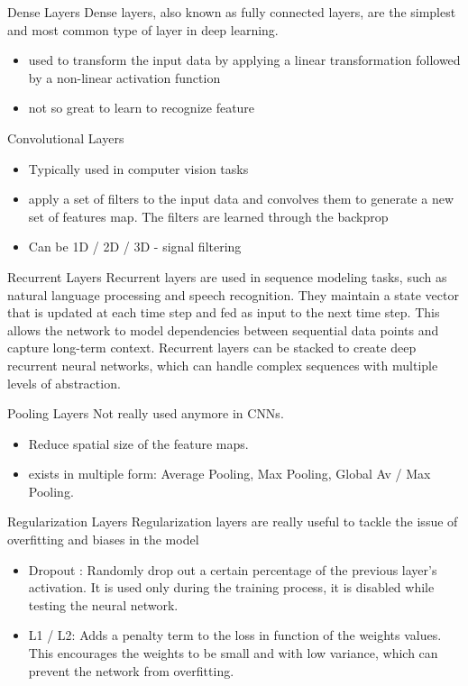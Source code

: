 \documentclass{beamer}
\begin{document}
\begin{frame}{Dense Layers}
    Dense layers, also known as fully connected layers, are the simplest and most common type of layer in deep learning.
    \begin{itemize}
        \item used to transform the input data by applying a linear transformation followed by a non-linear activation function 
        \item not so great to learn to recognize feature
    \end{itemize}
\end{frame}

\begin{frame}{Convolutional Layers}
    \begin{itemize}
        \item Typically used in computer vision tasks
        \item apply a set of filters to the input data and convolves them to generate a new set of features map. The filters are learned through the backprop
        \item Can be 1D / 2D / 3D - signal filtering
    \end{itemize}
\end{frame}

\begin{frame}{Recurrent Layers}
    Recurrent layers are used in sequence modeling tasks, such as natural language processing and speech recognition. They maintain a state vector that is updated at each time step and fed as input to the next time step. This allows the network to model dependencies between sequential data points and capture long-term context. Recurrent layers can be stacked to create deep recurrent neural networks, which can handle complex sequences with multiple levels of abstraction.
\end{frame}

\begin{frame}{Pooling Layers}
    Not really used anymore in CNNs.
    \begin{itemize}
        \item Reduce spatial size of the feature maps.
        \item exists in multiple form: Average Pooling, Max Pooling, Global Av / Max Pooling.
    \end{itemize}
\end{frame}

\begin{frame}{Regularization Layers}
    Regularization layers are really useful to tackle the issue of overfitting and biases in the model
    \begin{itemize}
        \item Dropout : Randomly drop out a certain percentage of the previous layer's activation. It is used only during the training process, it is disabled while testing the neural network.
        \item L1 / L2: Adds a penalty term to the loss in function of the weights values. This encourages the weights to be small and with low variance, which can prevent the network from overfitting.
    \end{itemize}
\end{frame}
\end{document}
